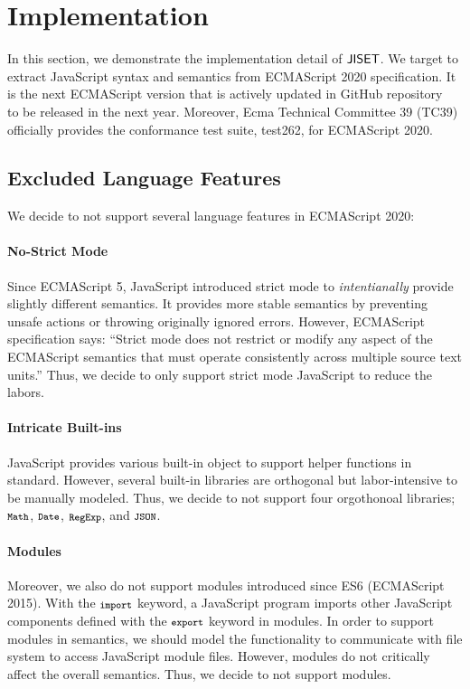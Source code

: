 \section{Implementation}\label{sec:impl}

In this section, we demonstrate the implementation detail of \( \text{\sf JISET} \).
We target to extract JavaScript syntax and semantics from
ECMAScript 2020 specification. It is the next ECMAScript version
that is actively updated in GitHub repository~\cite{es2020}
to be released in the next year. Moreover, Ecma Technical Committee 39 (TC39)
officially provides the conformance test suite, test262, for ECMAScript 2020.

\subsection{Excluded Language Features}
We decide to not support several language features in ECMAScript 2020:

\paragraph{No-Strict Mode}
Since ECMAScript 5, JavaScript introduced strict mode to \textit{intentianally} provide
slightly different semantics. It provides more stable semantics by preventing
unsafe actions or throwing originally ignored errors.
However, ECMAScript specification says:
``Strict mode does not restrict or modify any aspect of the ECMAScript semantics
that must operate consistently across multiple source text units.''
Thus, we decide to only support strict mode JavaScript to reduce the labors.

\paragraph{Intricate Built-ins}
JavaScript provides various built-in object to support helper functions in standard.
However, several built-in libraries are orthogonal but labor-intensive
to be manually modeled. Thus, we decide to not support
four orgothonoal libraries; \( \texttt{\footnotesize Math} \), \( \texttt{\footnotesize Date} \),
\( \texttt{\footnotesize RegExp} \), and \( \texttt{\footnotesize JSON} \).

\paragraph{Modules}
Moreover, we also do not support modules introduced since ES6 (ECMAScript 2015).
With the \( \texttt{\footnotesize import} \) keyword, a JavaScript program
imports other JavaScript components defined with the \( \texttt{\footnotesize export} \)
keyword in modules. In order to support modules in semantics, we should
model the functionality to communicate with file system to access
JavaScript module files. However, modules do not critically affect
the overall semantics. Thus, we decide to not support modules.


